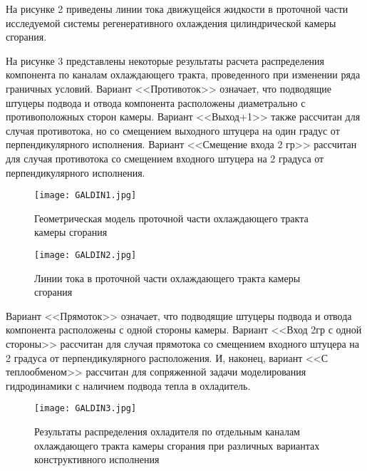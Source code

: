 На рисунке 2 приведены линии тока движущейся жидкости в проточной части исследуемой системы регенеративного охлаждения цилиндрической камеры сгорания.

На рисунке 3 представлены некоторые результаты расчета распределения компонента по каналам охлаждающего тракта,
проведенного при изменении ряда граничных условий.
Вариант <<Противоток>> означает,
что подводящие штуцеры подвода и отвода компонента расположены диаметрально с противоположных сторон камеры.
Вариант <<Выход+1>> также рассчитан для случая противотока,
но со смещением выходного штуцера на один градус от перпендикулярного исполнения.
Вариант <<Смещение входа 2 гр>> рассчитан для случая противотока со смещением входного штуцера на 2 градуса от перпендикулярного исполнения.

\begin{figure}
	\centering
	\texttt{[image: GALDIN1.jpg]}
	\caption{Геометрическая модель проточной части охлаждающего тракта камеры сгорания}
\end{figure}

\begin{figure}
	\centering
	\texttt{[image: GALDIN2.jpg]}
	\caption{Линии тока в проточной части охлаждающего тракта камеры сгорания}
\end{figure}

Вариант <<Прямоток>> означает, что подводящие штуцеры подвода и отвода компонента расположены с одной стороны камеры. Вариант <<Вход 2гр с одной стороны>> рассчитан для случая прямотока со смещением входного штуцера на 2 градуса от перпендикулярного расположения. И, наконец, вариант <<С теплообменом>> рассчитан для сопряженной задачи моделирования гидродинамики с наличием подвода тепла в охладитель.
\begin{figure}
	\centering
	\texttt{[image: GALDIN3.jpg]}
	\caption{Результаты распределения охладителя по отдельным каналам охлаждающего тракта камеры сгорания при различных вариантах конструктивного исполнения}
\end{figure}

